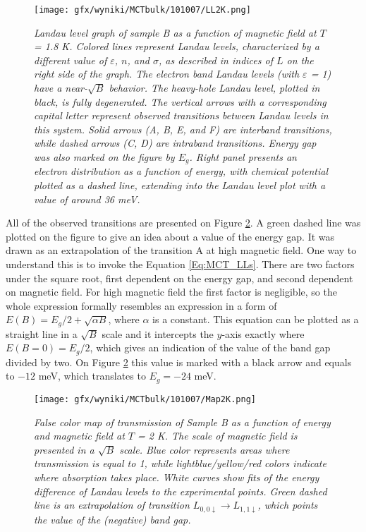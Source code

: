 \documentclass[titlepage,a4paper]{book}
\begin{document}
\begin{figure}[ht]
	\centering
	\texttt{[image: gfx/wyniki/MCTbulk/101007/LL2K.png]}
	\vspace{-10pt}
	\caption{\textit{Landau level graph of sample B as a function of magnetic field at $T$ = 1.8 K. Colored lines represent Landau levels, characterized by a different value of $\varepsilon$, $n$, and $\sigma$, as described in indices of $L$ on the right side of the graph. The electron band Landau levels (with $\varepsilon$ = 1) have a near-$\sqrt{B}$ behavior. The heavy-hole Landau level, plotted in black, is fully degenerated. The vertical arrows with a corresponding capital letter represent observed transitions between Landau levels in this system. Solid arrows (A, B, E, and F) are interband transitions, while dashed arrows (C, D) are intraband transitions. Energy gap was also marked on the figure by $E_g$. Right panel presents an electron distribution as a function of energy, with chemical potential plotted as a dashed line, extending into the Landau level plot with a value of around 36 meV.}}
	\label{fig:LL_101007_2K}
\end{figure}

All of the observed transitions are presented on Figure \ref{fig:Map_101007_2K}. A green dashed line was plotted on the figure to give an idea about a value of the energy gap. It was drawn as an extrapolation of the transition A at high magnetic field. One way to understand this is to invoke the Equation \ref{Eq:MCT_LLs}. There are two factors under the square root, first dependent on the energy gap, and second dependent on magnetic field. For high magnetic field the first factor is negligible, so the whole expression formally resembles an expression in a form of $E(B) = E_g/2 + \sqrt{\alpha B} $, where $\alpha$ is a constant. This equation can be plotted as a straight line in a $\sqrt{B}$ scale and it intercepts the $y$-axis exactly where $E(B = 0) = E_g/2$, which gives an indication of the value of the band gap divided by two. On Figure \ref{fig:Map_101007_2K} this value is marked with a black arrow and equals to $-12$ meV, which translates to $E_g = -24$ meV.
\begin{figure}[ht]
	\centering
	\texttt{[image: gfx/wyniki/MCTbulk/101007/Map2K.png]}
	\vspace{-10pt}
	\caption{\textit{False color map of transmission of Sample B as a function of energy and magnetic field at $T$ = 2 K. The scale of magnetic field is presented in a $\sqrt{B}$ scale. Blue color represents areas where transmission is equal to 1, while lightblue/yellow/red colors indicate where absorption takes place. White curves show fits of the energy difference of Landau levels to the experimental points. Green dashed line is an extrapolation of transition $L_{0,0\downarrow}\rightarrow L_{1,1\downarrow}$, which points the value of the (negative) band gap.}}
	\label{fig:Map_101007_2K}
\end{figure} 
\end{document}
